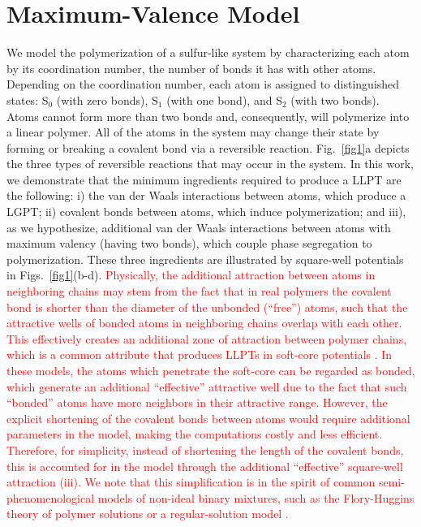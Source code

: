 \documentclass[9pt,twocolumn,twoside,lineno]{pnas-new}
\newcommand{\red}[1]{\textcolor{red}{#1}}
\begin{document}
\section*{Maximum-Valence Model}
We model the polymerization of a sulfur-like system by characterizing each atom by its coordination number, the number of bonds it has with other atoms. Depending on the coordination number, each atom is assigned to distinguished states: S$_0$ (with zero bonds), S$_1$ (with one bond), and S$_2$ (with two bonds). Atoms cannot form more than two bonds and, consequently, will polymerize into a linear polymer. All of the atoms in the system may change their state by forming or breaking a covalent bond via a reversible reaction. Fig.~\ref{fig1}a depicts the three types of reversible reactions that may occur in the system. In this work, we demonstrate that the minimum ingredients required to produce a LLPT are the following: i) the van der Waals interactions between atoms, which produce a LGPT; ii) covalent bonds between atoms, which induce polymerization; and iii), as we hypothesize, additional van der Waals interactions between atoms with maximum valency (having two bonds), which couple phase segregation to polymerization. These three ingredients are illustrated by square-well potentials in Figs.~\ref{fig1}(b-d). \red{Physically, the additional attraction between atoms in neighboring chains may stem from the fact that in real polymers the covalent bond is shorter than the diameter of the unbonded (``free'') atoms, such that the attractive wells of bonded atoms in neighboring chains overlap with each other. This effectively creates an additional zone of attraction between polymer chains, which is a common attribute that produces LLPTs in soft-core potentials \cite{Jagla2001,Franzese2001}. In these models, the atoms which penetrate the soft-core can be regarded as bonded, which generate an additional ``effective'' attractive well due to the fact that such ``bonded'' atoms have more neighbors in their attractive range. However, the explicit shortening of the covalent bonds between atoms would require additional parameters in the model, making the computations costly and less efficient. Therefore, for simplicity, instead of shortening the length of the covalent bonds, this is accounted for in the model through the additional “effective” square-well attraction (iii). We note that this simplification is in the spirit of common semi-phenomenological models of non-ideal binary mixtures, such as the Flory-Huggins theory of polymer solutions \cite{Flory_Polymer_1941,Huggins_Solutions_1941} or a regular-solution model \cite{Hildebrand_Regular_1962}.}
\end{document}
